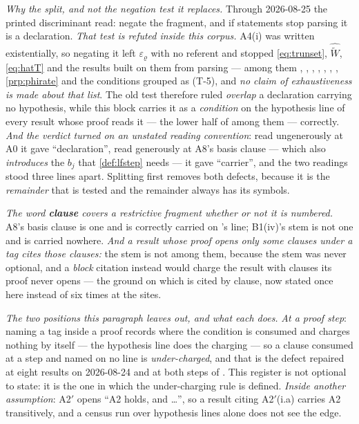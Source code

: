 \emph{Why the split, and not the negation test it replaces.} Through 2026-08-25 the printed discriminant
read: negate the fragment, and if statements stop parsing it is a declaration. \emph{That test is
refuted inside this corpus.} A4(i) was written existentially, so negating it left $\varepsilon_\varrho$
with no referent and stopped \eqref{eq:trunset}, $\widehat{\widetilde W}$, \eqref{eq:hatT} and the
results built on them from parsing --- among them ,
, , ,
, , ,
\cref{prp:phirate} and the conditions grouped as \textup{(T-5)}, and \emph{no claim of exhaustiveness is
made about that list}. The old test therefore ruled \emph{overlap} a declaration carrying no hypothesis,
while this block carries it as a \emph{condition} on the hypothesis line of every result whose proof
reads it --- the lower half of  among them --- correctly.
\emph{And the verdict turned on an unstated reading convention}: read ungenerously at
A0 it gave ``declaration'', read generously at A8's basis clause --- which also \emph{introduces} the
$b_j$ that \cref{def:lfstep} needs --- it gave ``carrier'', and the two readings stood three lines apart.
Splitting first removes both defects, because it is the \emph{remainder} that is tested and the
remainder always has its symbols.

\emph{The word \textbf{clause} covers a restrictive fragment whether or not it is numbered.} A8's basis
clause is one and is correctly carried on 's line; B1(iv)'s stem is not one and is
carried nowhere. \emph{And a result whose proof opens only some clauses under a tag cites those clauses:}
the stem is not among them, because the stem was never optional, and a \emph{block} citation instead
would charge the result with clauses its proof never opens --- the ground on which
 is cited by clause, now stated once here instead of six times at the sites.

\emph{The two positions this paragraph leaves out, and what each does.} \emph{At a proof step}: naming a
tag inside a proof records where the condition is consumed and charges nothing by itself --- the
hypothesis line does the charging --- so a clause consumed at a step and named on no line is
\emph{under-charged}, and that is the defect repaired at eight results on 2026-08-24 and at both steps of
. This register is not optional to state: it is the one in which the under-charging
rule is defined. \emph{Inside another assumption}: A2$'$ opens ``A2 holds, and \dots'', so a result
citing A2$'$(i.a) carries A2 transitively, and a census run over hypothesis lines alone does not see the
edge.

